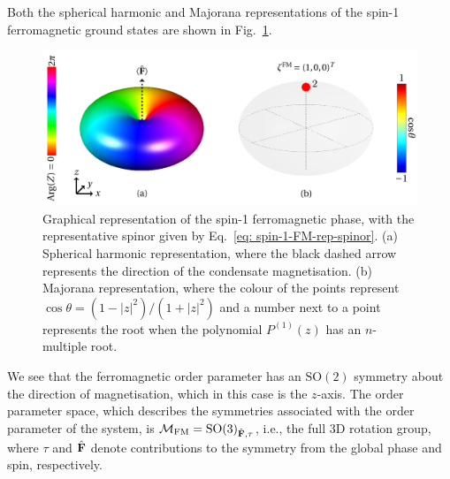 Both the spherical harmonic and Majorana representations of the spin-1
ferromagnetic ground states are shown in Fig.~\ref{fig: spin-1-FM-graph}.
\begin{figure}
    \centering
    \includegraphics[width=\textwidth]
    {gfx/ch-groundStateSymmetries/spin-1-FM.pdf}
    \caption[Graphical representations of the spin-1 ferromagnetic ground
    state]{\label{fig: spin-1-FM-graph}Graphical representation of the spin-1
    ferromagnetic phase, with the representative spinor given by
    Eq.~\eqref{eq: spin-1-FM-rep-spinor}.
    (a) Spherical harmonic representation, where the black dashed arrow
    represents the direction of the condensate magnetisation.
    (b) Majorana representation, where the colour of the points represent
    \(\cos\theta = (1-|z|^2)/(1+|z|^2)\) and a number next to a point represents
    the root when the polynomial \(P^{(1)}(z)\) has an \(n\)-multiple root.}
\end{figure}
We see that the ferromagnetic order parameter has an \(\text{SO}(2)\) symmetry
about the direction of magnetisation, which in this case is the \(z\)-axis.
The order parameter space, which describes the symmetries associated with the
order parameter of the system, is \(\mathcal{M}_\text{FM}
= {\text{SO}(3)}_{\hat{\vb{F}}, \tau}\), i.e.,
the full 3D rotation group, where \(\tau\) and \(\hat{\vb{F}}\) denote
contributions to the symmetry from the global phase and spin, respectively.

